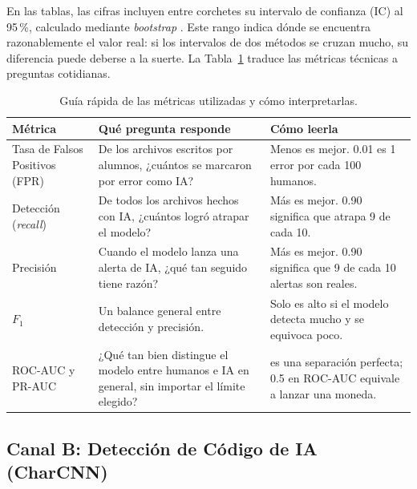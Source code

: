 En las tablas, las cifras incluyen entre corchetes su intervalo de confianza (IC) al 95\,\%, calculado mediante \textit{bootstrap} \cite{Efron1993Bootstrap}. Este rango indica dónde se encuentra razonablemente el valor real: si los intervalos de dos métodos se cruzan mucho, su diferencia puede deberse a la suerte. La Tabla~\ref{tab:glosario_metricas} traduce las métricas técnicas a preguntas cotidianas.

\begin{table}[H]
    \centering
    \caption{Guía rápida de las métricas utilizadas y cómo interpretarlas.}
    \label{tab:glosario_metricas}
    \renewcommand{\arraystretch}{1.25}
    \small
    \begin{tabularx}{\textwidth}{|>{\raggedright\arraybackslash}p{3.2cm}|>{\raggedright\arraybackslash}X|>{\raggedright\arraybackslash}p{3.8cm}|}
        \hline
        \textbf{Métrica} & \textbf{Qué pregunta responde} & \textbf{Cómo leerla} \\ \hline
        Tasa de Falsos Positivos (FPR) & De los archivos escritos por alumnos, ¿cuántos se marcaron por error como IA? & Menos es mejor. 0.01 es 1 error por cada 100 humanos. \\ \hline
        Detección (\textit{recall}) & De todos los archivos hechos con IA, ¿cuántos logró atrapar el modelo? & Más es mejor. 0.90 significa que atrapa 9 de cada 10. \\ \hline
        Precisión & Cuando el modelo lanza una alerta de IA, ¿qué tan seguido tiene razón? & Más es mejor. 0.90 significa que 9 de cada 10 alertas son reales. \\ \hline
        $F_1$ & Un balance general entre detección y precisión. & Solo es alto si el modelo detecta mucho y se equivoca poco. \\ \hline
        ROC-AUC y PR-AUC & ¿Qué tan bien distingue el modelo entre humanos e IA en general, sin importar el límite elegido? \cite{McDermott2024AUROC} & 1.0 es una separación perfecta; 0.5 en ROC-AUC equivale a lanzar una moneda. \\ \hline
    \end{tabularx}
\end{table}

\subsection{Canal B: Detección de Código de IA (CharCNN)}
\label{subsec:resultados_charcnn}

